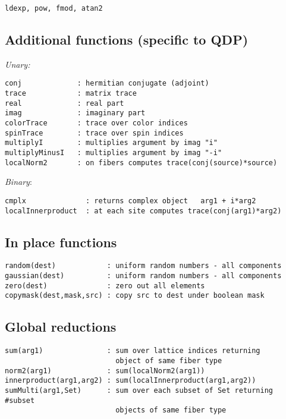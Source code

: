 \documentclass[12pt,letterpaper]{article}
\begin{document}
\begin{verbatim}
ldexp, pow, fmod, atan2
\end{verbatim}

\medskip


\subsection{Additional functions (specific to QDP)}
\label{sec:funcs}

\noindent
{\em Unary:}

\begin{verbatim}
conj             : hermitian conjugate (adjoint)
trace            : matrix trace
real             : real part
imag             : imaginary part
colorTrace       : trace over color indices
spinTrace        : trace over spin indices
multiplyI        : multiplies argument by imag "i"
multiplyMinusI   : multiplies argument by imag "-i"
localNorm2       : on fibers computes trace(conj(source)*source)
\end{verbatim}


\noindent
{\em Binary}:

\begin{verbatim}
cmplx              : returns complex object   arg1 + i*arg2
localInnerproduct  : at each site computes trace(conj(arg1)*arg2)
\end{verbatim}

\subsection{In place functions}
\label{sec:inplace}

\begin{verbatim}
random(dest)            : uniform random numbers - all components
gaussian(dest)          : uniform random numbers - all components
zero(dest)              : zero out all elements
copymask(dest,mask,src) : copy src to dest under boolean mask
\end{verbatim}

\medskip

\subsection{Global reductions}
\label{sec:reductions}

\begin{verbatim}
sum(arg1)               : sum over lattice indices returning 
                          object of same fiber type
norm2(arg1)             : sum(localNorm2(arg1))
innerproduct(arg1,arg2) : sum(localInnerproduct(arg1,arg2))
sumMulti(arg1,Set)      : sum over each subset of Set returning #subset
                          objects of same fiber type
\end{verbatim}
\end{document}
